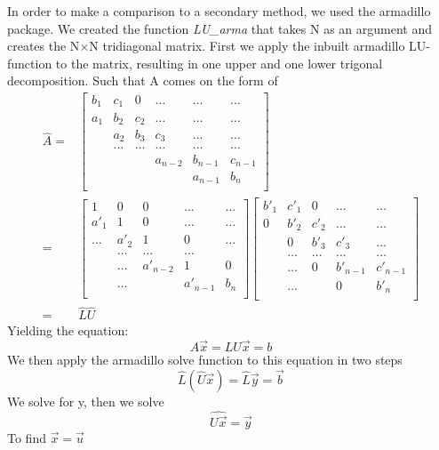 \documentclass[%
reprint,
amsmath,amssymb,
aps,
]{revtex4-1}
\begin{document}
In order to make a comparison to a secondary method, we used the armadillo package. We created the function \textit{LU\_arma} that takes N as an argument and creates the N$\times$N tridiagonal matrix. First we apply the inbuilt armadillo LU-function to the matrix, resulting in one upper and one lower trigonal decomposition. Such that A comes on the form of 
\begin{align*}
\hat{A} =& \begin{bmatrix}
b_1& c_1 & 0 &\dots   & \dots &\dots \\
a_1 & b_2 & c_2 &\dots &\dots &\dots \\
& a_2 & b_3 & c_3 & \dots & \dots \\
& \dots & \dots &\dots   &\dots & \dots \\
&   &  &a_{n-2}  & b_{n-1} & c_{n-1} \\
&    &  &   &a_{n-1} & b_n \\
\end{bmatrix} \\
=& \begin{bmatrix}
1& 0 & 0 &\dots   & \dots \\
a'_1 & 1 & 0 & \dots & \dots \\
\dots & a'_2 & 1 & 0 & \dots \\
& \dots   & \dots &\dots & \\
& \dots  & a'_{n-2}  &1& 0 \\
& \dots  &   &a'_{n-1} & b_n \\
\end{bmatrix}
\begin{bmatrix}
b'_1& c'_1 & 0 &\dots   & \dots \\
0 & b'_2 & c'_2 &\dots &\dots  \\
& 0 & b'_3 & c'_3 & \dots \\
& \dots   & \dots &\dots   &\dots \\
& \dots  & 0 & b'_{n-1} & c'_{n-1} \\
& \dots  &   & 0 & b'_n \\
\end{bmatrix} \\
=& \hat{L}\hat{U}
\end{align*} 
Yielding the equation:
\begin{equation}
A\vec{x} = LU\vec{x} = b
\end{equation}
We then apply the armadillo solve function to this equation in two steps 
\begin{equation}
\hat{L} (\hat{U}\vec{x}) = \hat{L}\vec{y} = \vec{b}
\end{equation}
We solve for y, then we solve 
\begin{equation}
\hat{U\vec{x}} = \vec{y}
\end{equation}
To find $\vec{x} = \vec{u}$
\end{document}
